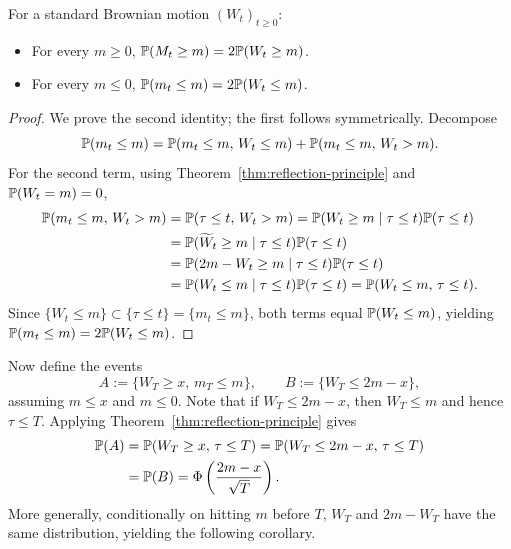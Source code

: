 \begin{theorem}\label{thm:running-extrema}
    For a standard Brownian motion $(W_t)_{t \ge 0}$:
    \begin{itemize}
        \item For every $m \ge 0$, $\mathbb{P}(M_t \ge m) = 2\mathbb{P}(W_t \ge m)$.
        \item For every $m \le 0$, $\mathbb{P}(m_t \le m) = 2\mathbb{P}(W_t \le m)$.
    \end{itemize}
\end{theorem}
\begin{proof}
    We prove the second identity; the first follows symmetrically. Decompose
    \[
    \mathbb{P}(m_t \le m) = \mathbb{P}(m_t \le m,\, W_t \le m) + \mathbb{P}(m_t \le m,\, W_t > m).
    \]
    For the second term, using Theorem~\ref{thm:reflection-principle} and $\mathbb{P}(W_t = m) = 0$,
    \[
    \begin{aligned}
        \mathbb{P}(m_t \le m,\, W_t > m) &= \mathbb{P}(\tau \le t,\, W_t > m) = \mathbb{P}(W_t \ge m \mid \tau \le t)\mathbb{P}(\tau \le t) \\
        &= \mathbb{P}(\widetilde{W}_t \ge m \mid \tau \le t)\mathbb{P}(\tau \le t) \\
        &= \mathbb{P}(2m - W_t \ge m \mid \tau \le t)\mathbb{P}(\tau \le t) \\
        &= \mathbb{P}(W_t \le m \mid \tau \le t)\mathbb{P}(\tau \le t) = \mathbb{P}(W_t \le m,\, \tau \le t).
    \end{aligned}
    \]
    Since $\{W_t \le m\} \subset \{\tau \le t\} = \{m_t \le m\}$, both terms equal $\mathbb{P}(W_t \le m)$, yielding $\mathbb{P}(m_t \le m) = 2\mathbb{P}(W_t \le m)$.
\end{proof}

Now define the events
\[
A := \{W_T \ge x,\, m_T \le m\}, \qquad B := \{W_T \le 2m - x\},
\]
assuming $m \le x$ and $m \le 0$. Note that if $W_T \le 2m - x$, then $W_T \le m$ and hence $\tau \le T$. Applying Theorem~\ref{thm:reflection-principle} gives
\[
\begin{aligned}
    \mathbb{P}(A) &= \mathbb{P}(W_T \ge x,\, \tau \le T) = \mathbb{P}(W_T \le 2m - x,\, \tau \le T) \\
             &= \mathbb{P}(B) = \Phi\left(\frac{2m - x}{\sqrt{T}}\right).
\end{aligned}
\]
More generally, conditionally on hitting $m$ before $T$, $W_T$ and $2m - W_T$ have the same distribution, yielding the following corollary.


